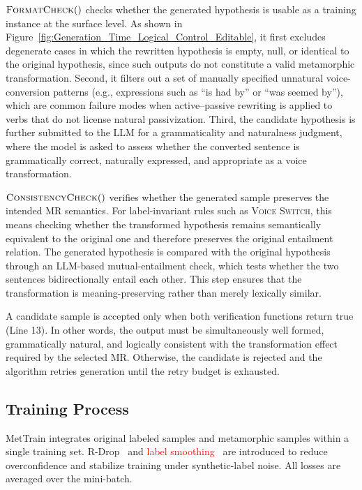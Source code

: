 \documentclass[lettersize,journal]{IEEEtran}
\newcommand{\red}[1]{\textcolor{red}{#1}}
\begin{document}
$\Call{FormatCheck}{ }$ checks whether the generated hypothesis is usable as a training instance at the surface level. As shown in Figure~\ref{fig:Generation_Time_Logical_Control_Editable}, it first excludes degenerate cases in which the rewritten hypothesis is empty, null, or identical to the original hypothesis, since such outputs do not constitute a valid metamorphic transformation. Second, it filters out a set of manually specified unnatural voice-conversion patterns (e.g., expressions such as ``is had by'' or ``was seemed by''), which are common failure modes when active--passive rewriting is applied to verbs that do not license natural passivization. Third, the candidate hypothesis is further submitted to the LLM for a grammaticality and naturalness judgment, where the model is asked to assess whether the converted sentence is grammatically correct, naturally expressed, and appropriate as a voice transformation. 

$\Call{ConsistencyCheck}{ }$ verifies whether the generated sample preserves the intended MR semantics. For label-invariant rules such as \textsc{Voice Switch}, this means checking whether the transformed hypothesis remains semantically equivalent to the original one and therefore preserves the original entailment relation. The generated hypothesis is compared with the original hypothesis through an LLM-based mutual-entailment check, which tests whether the two sentences bidirectionally entail each other. This step ensures that the transformation is meaning-preserving rather than merely lexically similar. 

A candidate sample is accepted only when both verification functions return true (Line 13). In other words, the output must be simultaneously well formed, grammatically natural, and logically consistent with the transformation effect required by the selected MR. Otherwise, the candidate is rejected and the algorithm retries generation until the retry budget is exhausted.


\subsection{Training Process} 
MetTrain integrates original labeled samples and metamorphic samples within a single training set. R-Drop~\cite{DBLP:conf/nips/LiangWLWMQCZL21} and \red{label smoothing~\cite{7780677}} are introduced to reduce overconfidence and stabilize training under synthetic-label noise. All losses are averaged over the mini-batch. 
\end{document}
